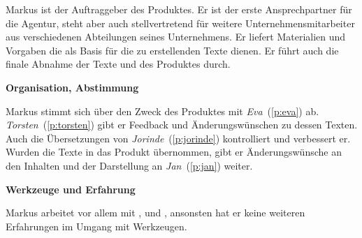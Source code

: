 \begin{multicols}{2}

\begin{center}
\end{center}


Markus ist der Auftraggeber des Produktes. Er ist der erste Ansprechpartner für die Agentur, steht aber auch stellvertretend für weitere Unternehmensmitarbeiter aus verschiedenen Abteilungen seines Unternehmens. Er liefert Materialien und Vorgaben die als Basis für die zu erstellenden Texte dienen. Er führt auch die finale Abnahme der Texte und des Produktes durch.

\textbf{Organisation, Abstimmung}

Markus stimmt sich über den Zweck des Produktes mit \emph{Eva}~(\ref{p:eva}) ab. \emph{Torsten}~(\ref{p:torsten}) gibt er Feedback und Änderungswünschen zu dessen Texten. Auch die Übersetzungen von \emph{Jorinde}~(\ref{p:jorinde}) kontrolliert und verbessert er. Wurden die Texte in das Produkt übernommen, gibt er Änderungswünsche an den Inhalten und der Darstellung an \emph{Jan}~(\ref{p:jan}) weiter.

\textbf{Werkzeuge und Erfahrung}

Markus arbeitet vor allem mit ,  und , ansonsten hat er keine weiteren Erfahrungen im Umgang mit Werkzeugen.

\columnbreak


\end{multicols}
